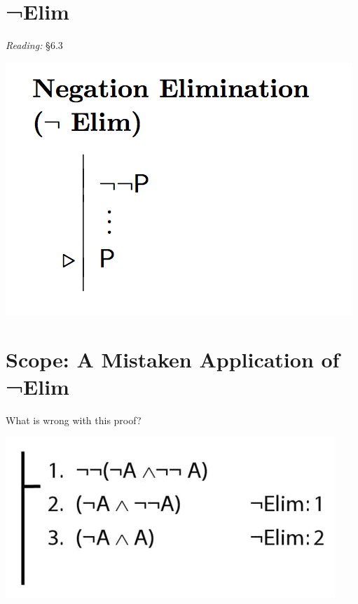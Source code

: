 \documentclass[12pt]{extarticle}
\begin{document}
\begin{multicols*}{3}
\begin{minipage}{\columnwidth}
\section{¬Elim}
 
\emph{Reading:} §6.3
 
\begin{center}
\includegraphics[scale=0.3]{img/rule_negation_elim.png}
\end{center}
\end{minipage} 
 
\section{Scope: A Mistaken Application of ¬Elim}
 
What is wrong with this proof?
 
\begin{center}
\includegraphics[scale=0.3]{img/proof_negation_elim_wrong.png}
\end{center}
 

\end{multicols*}
\end{document}
